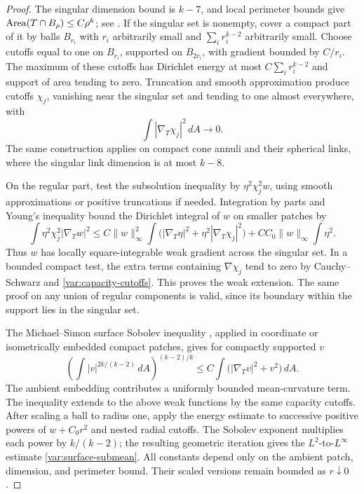 \begin{proof}
The singular dimension bound is $k-7$, and local perimeter bounds give
$\operatorname{Area}(T\cap B_\rho)\leq C\rho^k$; see
\cite{SimonGMT2014}.  If the singular set is nonempty, cover a compact
part of it by balls $B_{r_i}$ with $r_i$ arbitrarily small and
$\sum_i r_i^{k-2}$ arbitrarily small.  Choose cutoffs equal to one on
$B_{r_i}$, supported on $B_{2r_i}$, with gradient bounded by $C/r_i$.
The maximum of these cutoffs has Dirichlet energy at most
$C\sum_i r_i^{k-2}$ and support of area tending to zero.  Truncation
and smooth approximation produce cutoffs $\chi_j$, vanishing near
the singular set and tending to one almost everywhere, with
\begin{equation}\label{var:capacity-cutoffs}
 \int|\nabla_T\chi_j|^2\,dA\longrightarrow0.
\end{equation}
The same construction applies on compact cone annuli and their
spherical links, where the singular link dimension is at most $k-8$.

On the regular part, test the subsolution inequality by
$\eta^2\chi_j^2w$, using smooth approximations or positive
truncations if needed.  Integration by parts and Young's inequality
bound the Dirichlet integral of $w$ on smaller patches by
\begin{equation}\label{var:subsolution-Caccioppoli}
 \int\eta^2\chi_j^2|\nabla_Tw|^2
 \leq C\|w\|_\infty^2
       \int\bigl(|\nabla_T\eta|^2+
                     \eta^2|\nabla_T\chi_j|^2\bigr)
       +C C_0\|w\|_\infty\int\eta^2.
\end{equation}
Thus $w$ has locally square-integrable weak gradient across the
singular set.  In a bounded compact test, the extra terms containing
$\nabla\chi_j$ tend to zero by Cauchy--Schwarz and
\eqref{var:capacity-cutoffs}.  This proves the weak extension.
The same proof on any union of regular components is valid, since
its boundary within the support lies in the singular set.

The Michael--Simon surface Sobolev inequality
\cite{MichaelSimon1973}, applied in coordinate or isometrically
embedded compact patches, gives for compactly supported $v$
\begin{equation}\label{var:surface-Sobolev}
 \left(\int|v|^{2k/(k-2)}\,dA\right)^{(k-2)/k}
 \leq C\int\bigl(|\nabla_Tv|^2+v^2\bigr)\,dA.
\end{equation}
The ambient embedding contributes a uniformly bounded mean-curvature
term.  The inequality extends to the above weak functions by the
same capacity cutoffs.  After scaling a ball to radius one, apply
the energy estimate to successive positive powers of
$w+C_0r^2$ and nested radial cutoffs.  The Sobolev exponent multiplies
each power by $k/(k-2)$; the resulting geometric iteration gives
the $L^2$-to-$L^\infty$ estimate
\eqref{var:surface-submean}.  All constants depend only on the
ambient patch, dimension, and perimeter bound.  Their scaled versions
remain bounded as $r\downarrow0$.
\end{proof}

